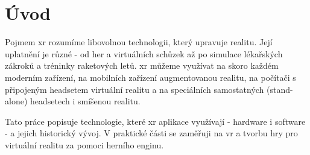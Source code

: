 \chapter*{Úvod}

Pojmem \gls{xr} rozumíme libovolnou technologii, který upravuje realitu. Její uplatnění je různé - od her a virtuálních schůzek až po simulace lékařských zákroků a tréninky raketových letů. \cite{muni_kybernetika} \gls{xr} můžeme využívat na skoro každém moderním zařízení, na mobilních zařízení augmentovanou realitu, na počítači s připojeným headsetem virtuální realitu a na speciálních samostatných (stand-alone) headsetech i smíšenou realitu. 

Tato práce popisuje technologie, které \gls{xr} aplikace využívají - hardware i software - a jejich historický vývoj. V praktické části se zaměřuji na \gls{vr} a tvorbu hry pro virtuální realitu za pomoci herního enginu.  